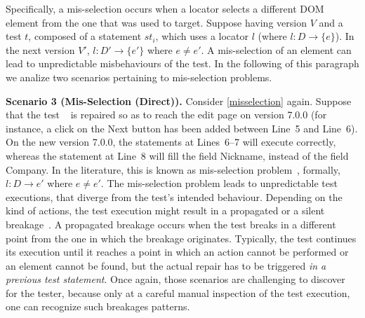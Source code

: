 Specifically, a mis-selection occurs when a locator selects a different DOM element from the one that was used to target. Suppose having version $V$ and a test $t$, composed of a statement $st_i$, which uses a locator $l$ (where $l: D \rightarrow \{e\}$).
In the next version $V'$, $l: D' \rightarrow \{e'\}$ where $e \ne e'$.
A mis-selection of an element can lead to unpredictable misbehaviours of the test. In the following of this paragraph we analize two scenarios pertaining to mis-selection problems. 

\noindent
\textbf{Scenario 3 (Mis-Selection (Direct)).} 
Consider \autoref{misselection} again. 
Suppose that the test~\textcircled{} is repaired so as to reach the edit page on version 7.0.0 (for instance, a click on the Next button has been added between Line~5 and Line~6). On the new version 7.0.0, the statements at Lines~6--7 will execute correctly, whereas the statement at Line~8 will fill the field Nickname, instead of the field Company. In the literature, this is known as mis-selection problem~\cite{Choudhary:2011:WWA:2002931.2002935}, formally, $l: D \rightarrow e'$ where $e \ne e'$. The mis-selection problem leads to unpredictable test executions, that diverge from the test's intended behaviour. Depending on the kind of actions, the test execution might result in a propagated or a silent breakage~\cite{Hammoudi-2016-ICST}. A propagated breakage occurs when the test breaks in a different point from the one in which the breakage originates. Typically, the test continues its execution until it reaches a point in which an action cannot be performed or an element cannot be found, but the actual repair has to be triggered \textit{in a previous test statement}. Once again, those scenarios are challenging to discover for the tester, because only at a careful manual inspection of the test execution, one can recognize such breakages patterns.


